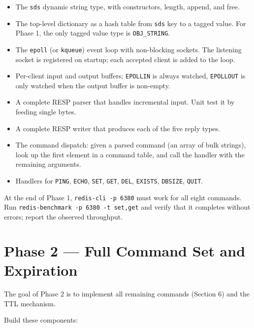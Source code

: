 \documentclass[11pt,a4paper]{article}
\begin{document}
\begin{itemize}
\item The \texttt{sds} dynamic string type, with constructors, length, append, and free.

\item The top-level dictionary as a hash table from \texttt{sds} key to a tagged value. For Phase 1, the only tagged value type is \texttt{OBJ\_STRING}.

\item The \texttt{epoll} (or \texttt{kqueue}) event loop with non-blocking sockets. The listening socket is registered on startup; each accepted client is added to the loop.

\item Per-client input and output buffers; \texttt{EPOLLIN} is always watched, \texttt{EPOLLOUT} is only watched when the output buffer is non-empty.

\item A complete RESP parser that handles incremental input. Unit test it by feeding single bytes.

\item A complete RESP writer that produces each of the five reply types.

\item The command dispatch: given a parsed command (an array of bulk strings), look up the first element in a command table, and call the handler with the remaining arguments.

\item Handlers for \texttt{PING}, \texttt{ECHO}, \texttt{SET}, \texttt{GET}, \texttt{DEL}, \texttt{EXISTS}, \texttt{DBSIZE}, \texttt{QUIT}.
\end{itemize}

At the end of Phase 1, \texttt{redis-cli -p 6380} must work for all eight commands. Run \texttt{redis-benchmark -p 6380 -t set,get} and verify that it completes without errors; report the observed throughput.

\section{Phase 2 --- Full Command Set and Expiration}

The goal of Phase 2 is to implement all remaining commands (Section 6) and the TTL mechanism.

Build these components:
\end{document}
